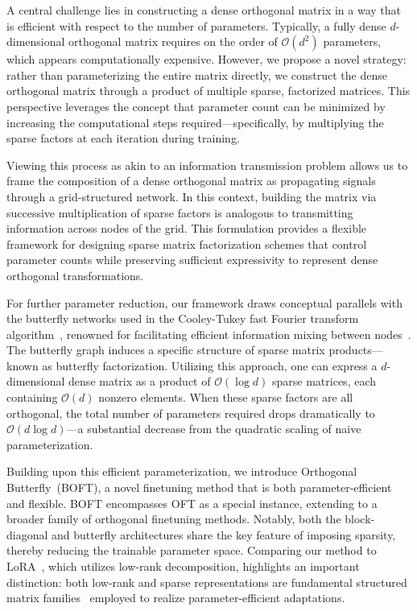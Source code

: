 A central challenge lies in constructing a dense orthogonal matrix in a way that is efficient with respect to the number of parameters. Typically, a fully dense $d$-dimensional orthogonal matrix requires on the order of $\mathcal{O}(d^2)$ parameters, which appears computationally expensive. However, we propose a novel strategy: rather than parameterizing the entire matrix directly, we construct the dense orthogonal matrix through a product of multiple sparse, factorized matrices. This perspective leverages the concept that parameter count can be minimized by increasing the computational steps required—specifically, by multiplying the sparse factors at each iteration during training. 

Viewing this process as akin to an information transmission problem allows us to frame the composition of a dense orthogonal matrix as propagating signals through a grid-structured network. In this context, building the matrix via successive multiplication of sparse factors is analogous to transmitting information across nodes of the grid. This formulation provides a flexible framework for designing sparse matrix factorization schemes that control parameter counts while preserving sufficient expressivity to represent dense orthogonal transformations.

For further parameter reduction, our framework draws conceptual parallels with the butterfly networks used in the Cooley-Tukey fast Fourier transform algorithm~\cite{cooley1965algorithm}, renowned for facilitating efficient information mixing between nodes~\cite{klasing1994broadcasting}. The butterfly graph induces a specific structure of sparse matrix products—known as butterfly factorization. Utilizing this approach, one can express a $d$-dimensional dense matrix as a product of $\mathcal{O}(\log d)$ sparse matrices, each containing $\mathcal{O}(d)$ nonzero elements. When these sparse factors are all orthogonal, the total number of parameters required drops dramatically to $\mathcal{O}(d\log d)$—a substantial decrease from the quadratic scaling of naive parameterization.

Building upon this efficient parameterization, we introduce Orthogonal Butterfly~(BOFT), a novel finetuning method that is both parameter-efficient and flexible. BOFT encompasses OFT as a special instance, extending to a broader family of orthogonal finetuning methods. Notably, both the block-diagonal and butterfly architectures share the key feature of imposing sparsity, thereby reducing the trainable parameter space. Comparing our method to LoRA~\cite{hulora2022}, which utilizes low-rank decomposition, highlights an important distinction: both low-rank and sparse representations are fundamental structured matrix families~\cite{candes2011robust} employed to realize parameter-efficient adaptations.

